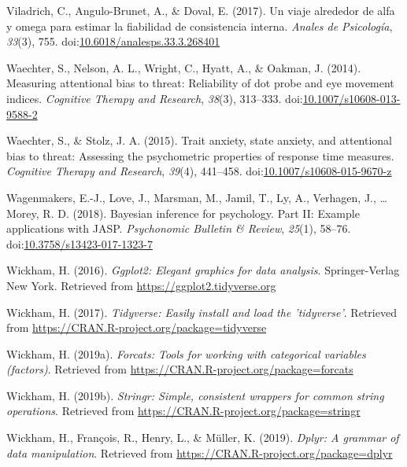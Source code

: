 \documentclass[english,,man,floatsintext]{apa6}
\begin{document}
\leavevmode\hypertarget{ref-viladrich_viaje_2017}{}%
Viladrich, C., Angulo-Brunet, A., \& Doval, E. (2017). Un viaje alrededor de alfa y omega para estimar la fiabilidad de consistencia interna. \emph{Anales de Psicología}, \emph{33}(3), 755. doi:\href{https://doi.org/10.6018/analesps.33.3.268401}{10.6018/analesps.33.3.268401}

\leavevmode\hypertarget{ref-waechter_measuring_2014}{}%
Waechter, S., Nelson, A. L., Wright, C., Hyatt, A., \& Oakman, J. (2014). Measuring attentional bias to threat: Reliability of dot probe and eye movement indices. \emph{Cognitive Therapy and Research}, \emph{38}(3), 313--333. doi:\href{https://doi.org/10.1007/s10608-013-9588-2}{10.1007/s10608-013-9588-2}

\leavevmode\hypertarget{ref-waechter_trait_2015}{}%
Waechter, S., \& Stolz, J. A. (2015). Trait anxiety, state anxiety, and attentional bias to threat: Assessing the psychometric properties of response time measures. \emph{Cognitive Therapy and Research}, \emph{39}(4), 441--458. doi:\href{https://doi.org/10.1007/s10608-015-9670-z}{10.1007/s10608-015-9670-z}

\leavevmode\hypertarget{ref-wagenmakers_bayesian_2018-2}{}%
Wagenmakers, E.-J., Love, J., Marsman, M., Jamil, T., Ly, A., Verhagen, J., \ldots{} Morey, R. D. (2018). Bayesian inference for psychology. Part II: Example applications with JASP. \emph{Psychonomic Bulletin \& Review}, \emph{25}(1), 58--76. doi:\href{https://doi.org/10.3758/s13423-017-1323-7}{10.3758/s13423-017-1323-7}

\leavevmode\hypertarget{ref-R-ggplot2}{}%
Wickham, H. (2016). \emph{Ggplot2: Elegant graphics for data analysis}. Springer-Verlag New York. Retrieved from \url{https://ggplot2.tidyverse.org}

\leavevmode\hypertarget{ref-R-tidyverse}{}%
Wickham, H. (2017). \emph{Tidyverse: Easily install and load the 'tidyverse'}. Retrieved from \url{https://CRAN.R-project.org/package=tidyverse}

\leavevmode\hypertarget{ref-R-forcats}{}%
Wickham, H. (2019a). \emph{Forcats: Tools for working with categorical variables (factors)}. Retrieved from \url{https://CRAN.R-project.org/package=forcats}

\leavevmode\hypertarget{ref-R-stringr}{}%
Wickham, H. (2019b). \emph{Stringr: Simple, consistent wrappers for common string operations}. Retrieved from \url{https://CRAN.R-project.org/package=stringr}

\leavevmode\hypertarget{ref-R-dplyr}{}%
Wickham, H., François, R., Henry, L., \& Müller, K. (2019). \emph{Dplyr: A grammar of data manipulation}. Retrieved from \url{https://CRAN.R-project.org/package=dplyr}
\end{document}
